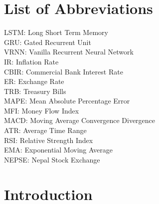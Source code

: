 \chapter*{List of Abbreviations}
LSTM:  Long Short Term Memory\\
GRU:    Gated Recurrent Unit\\
VRNN: Vanilla Recurrent Neural Network\\
IR:         Inflation Rate \\
CBIR:   Commercial Bank Interest Rate\\
ER:        Exchange Rate\\
TRB:      Treasury Bills\\
MAPE:   Mean Absolute Percentage Error\\
MFI:       Money Flow Index\\
MACD:  Moving Average Convergence Divergence\\
ATR:      Average Time Range\\
RSI:        Relative Strength Index\\
EMA:     Exponential Moving Average\\
NEPSE:  Nepal Stock Exchange\\


\newpage
{} %

\chapter{Introduction}
\vspace{-18pt}
